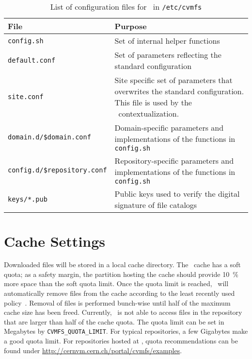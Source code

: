 \begin{table}
	\begin{center}
		\begin{tabularx}{\linewidth}{lX}
			\toprule
			{\bf\centering File} & {\bf\centering Purpose} \\
			\midrule
			\texttt{config.sh} & Set of internal helper functions \\
			\texttt{default.conf} & Set of parameters reflecting the standard configuration \\
			\texttt{site.conf} & Site specific set of parameters that overwrites the standard configuration.  
				This file is used by the \cernvm\ contextualization. \\
			\texttt{domain.d/\$domain.conf} & Domain-specific parameters and implementations of the functions in \texttt{config.sh} \\
			\texttt{config.d/\$repository.conf} & Repository-specific parameters and implementations of the functions in \texttt{config.sh} \\
			\texttt{keys/*.pub} & Public keys used to verify the digital signature of file catalogs \\
			\bottomrule
		\end{tabularx}
	\end{center}
	\caption{List of configuration files for \cvmfs\ in \texttt{/etc/cvmfs}}
	\label{tbl:configfiles}
\end{table}


\section{Cache Settings}
\label{sct:config:cache}
Downloaded files will be stored in a local cache directory.
The \cvmfs\ cache has a soft quota; as a safety margin, the partition hosting the cache should provide \SI{10}{\percent} more space than the soft quota limit.
Once the quota limit is reached, \cvmfs\ will automatically remove files from the cache according to the least recently used policy~\cite{lru06}.
Removal of files is performed bunch-wise until half of the maximum cache size has been freed.
Currently, \cvmfs\ is not able to access files in the repository that are larger than half of the cache quota.
The quota limit can be set in Megabytes by \texttt{CVMFS\_QUOTA\_LIMIT}.
For typical repositories, a few Gigabytes make a good quota limit.
For repositories hosted at \cern, quota recommendations can be found under \url{http://cernvm.cern.ch/portal/cvmfs/examples}.

